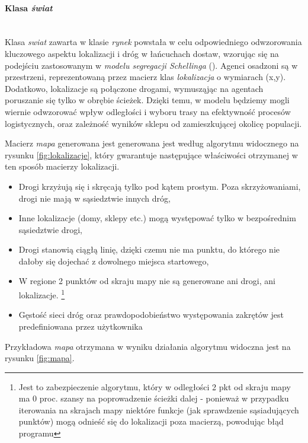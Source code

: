 \documentclass[polish, twoside, 12pt, a4paper]{article}
\theoremstyle{definition}
\theoremstyle{plain}
\theoremstyle{remark}
\begin{document}
\paragraph{Klasa \textit{świat}}\mbox{}\\

Klasa \textit{swiat} zawarta w klasie \textit{rynek} powstała w celu odpowiedniego odwzorowania kluczowego aspektu lokalizacji i dróg w łańcuchach dostaw, wzorując się na podejściu zastosowanym w \textit{modelu segregacji Schellinga} (\cite{Schelling1971}). Agenci osadzoni są w przestrzeni, reprezentowaną przez macierz klas \textit{lokalizacja} o wymiarach (x,y). Dodatkowo, lokalizacje są połączone drogami, wymusząjąc na agentach poruszanie się tylko w obrębie ścieżek. Dzięki temu, w modelu będziemy mogli wiernie odwzorować wpływ odległości i wyboru trasy na efektywność procesów logistycznych, oraz zależność wyników sklepu od zamieszkującej okolicę populacji. 

Macierz \textit{mapa} generowana jest generowana jest według algorytmu widocznego na rysunku \ref{fig:lokalizacje}, który gwarantuje następujące właściwości otrzymanej w ten sposób macierzy lokalizacji. 

	\begin{itemize}
		\item Drogi krzyżują się i skręcają tylko pod kątem prostym. Poza skrzyżowaniami, drogi nie mają w sąsiedztwie innych dróg,
		\item Inne lokalizacje (domy, sklepy etc.) mogą występować tylko w bezpośrednim sąsiedztwie drogi,
		\item Drogi stanowią ciągłą linię, dzięki czemu nie ma punktu, do którego nie dałoby się dojechać z dowolnego miejsca startowego,
		\item W regione 2 punktów od skraju mapy nie są generowane ani drogi, ani lokalizacje.  \footnote{Jest to zabezpieczenie algorytmu, który w odległości 2 pkt od skraju mapy ma 0 proc. szansy na poprowadzenie ścieżki dalej - ponieważ w przypadku iterowania na skrajach mapy niektóre funkcje (jak sprawdzenie sąsiadujących punktów) mogą odnieść się do lokalizacji poza macierzą, powodując błąd programu}
	 	\item Gęstość sieci dróg oraz prawdopodobieństwo występowania zakrętów jest predefiniowana przez użytkownika
	\end{itemize}

Przykładowa \textit{mapa} otrzymana w wyniku działania algorytmu widoczna jest na rysunku \ref{fig:mapa}.
 \\
\end{document}
